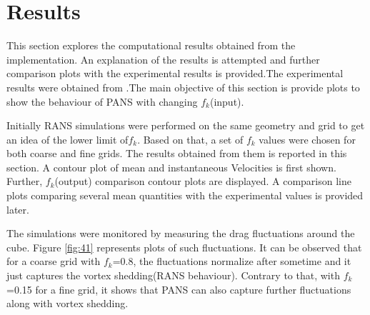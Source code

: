 \chapter{Results }

\hspace{0.25cm}This section explores the computational results obtained from the implementation. An explanation of the results is attempted and further comparison plots with the experimental results is provided.The experimental results were obtained from \cite{exp}.The main objective of this section is provide plots to show the behaviour of PANS with changing $f_k$(input).


\hspace{0.25cm}Initially RANS simulations were performed on the same geometry and grid to get an idea of the lower limit of$f_k$. Based on that, a set of $f_k$ values were chosen for both coarse and fine grids. The results obtained from them is reported in this section. A contour plot of mean and instantaneous Velocities is first shown. Further, $f_k$(output) comparison contour plots are displayed. A comparison line plots comparing several mean quantities with the experimental values is provided later.

\hspace{0.25cm}The simulations were monitored by measuring the drag fluctuations around the cube. Figure \ref{fig:41} represents plots of such fluctuations. It can be observed that for a coarse grid with $f_k$=0.8, the fluctuations normalize after sometime and it just captures the vortex shedding(RANS behaviour). Contrary to that, with $f_k$=0.15 for a fine grid, it shows that PANS can also capture further fluctuations along with vortex shedding.

